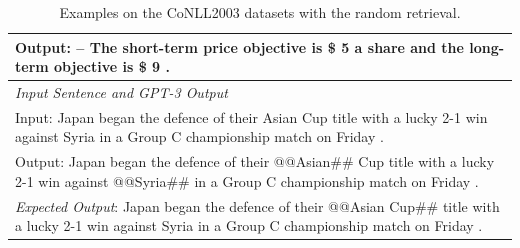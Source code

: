\documentclass[11pt]{article}
\begin{document}
\begin{table}[th!]
{\begin{tabular}{l}
Output: -- The short-term price objective is \$ 5 a share and the long-term objective is \$ 9 . \\\midrule
\textit{Input Sentence and GPT-3 Output} \\
Input: Japan began the defence of their Asian Cup title with a lucky 2-1 win against Syria in a Group C championship match on Friday . \\
Output: Japan began the defence of their @@Asian\#\# Cup title with a lucky 2-1 win against @@Syria\#\# in a Group C championship match on Friday . \\
{\color{blue}\it Expected Output}: Japan began the defence of their @@Asian Cup\#\# title with a lucky 2-1 win against Syria in a Group C championship match on Friday . \\\bottomrule
    \end{tabular}
    }
     \caption{Examples on the CoNLL2003 datasets with the random retrieval.}
    \label{tab:example_random_retrieval_embedding}
\end{table}
\end{document}
